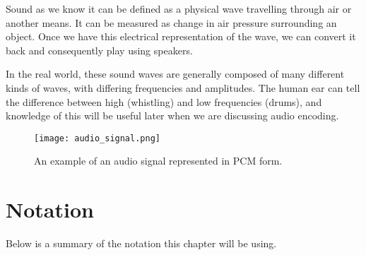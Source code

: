 Sound as we know it can be defined as a physical wave travelling through air or another means. \cite{you_2010} It can be measured as change in air pressure surrounding an object. Once we have this electrical representation of the wave, we can convert it back and consequently play using speakers.

In the real world, these sound waves are generally composed of many different kinds of waves, with differing frequencies and amplitudes. The human ear can tell the difference between high (whistling) and low frequencies (drums), and knowledge of this will be useful later when we are discussing audio encoding.

\begin{figure}[ht]
	\caption[Example audio signal]{An example of an audio signal represented in PCM form.}
	\label{fig:audio_signal}
	\centering
	\texttt{[image: audio\_signal.png]}
\end{figure}

\section{Notation}
Below is a summary of the notation this chapter will be using.

